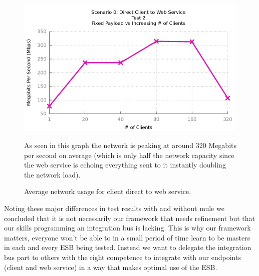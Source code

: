 \begin{figure}
	\caption{Average network usage for client direct to web service.}
	\centerline{\includegraphics{img/direct_fp_iu_kbs}}
	\label{fig:direct-2-3}
	As seen in this graph the network is peaking at around 320 Megabits per second on average (which is only half the network capacity since the web service is echoing everything sent to it instantly doubling the network load).
\end{figure}

Noting these major differences in test results with and without mule we concluded that it is not necessarily our framework that needs refinement but that our skills programming an integration bus is lacking. This is why our framework matters, everyone won't be able to in a small period of time learn to be masters in each and every ESB being tested. Instead we want to delegate the integration bus part to others with the right competence to integrate with our endpoints (client and web service) in a way that makes optimal use of the ESB.

